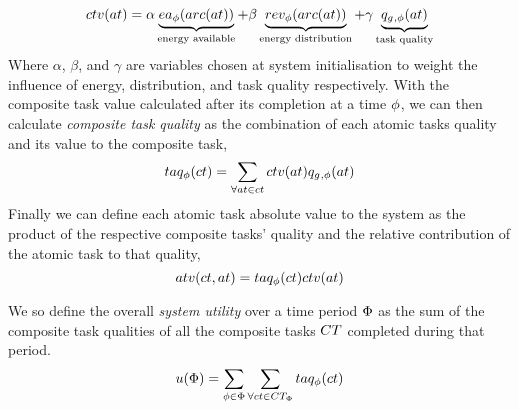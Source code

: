 \begin{equation}
	\label{eq:ctv}
	\functionCompositeTaskValue{}{} = 
	\alpha\underbrace{\functionEnergyAvailable{\functionTaskArc{}{}}{}}_{\text{energy available}}
	+ \beta\underbrace{\functionEnergyVariability{\functionTaskArc{}{}}{}}_{\text{energy distribution}}
	+ 
	\gamma\underbrace{\functionAtomicTaskQualitySignature{}{}}_{\text{task quality}}
\end{equation}
Where $\alpha$, $\beta$, and $\gamma$ are variables chosen at system initialisation to weight the influence of energy, distribution, and task quality respectively. With the composite task value calculated after its completion  at a time $\phi$, we can then calculate \textit{composite task quality} as the combination of each atomic tasks quality and its value to the composite task,
\begin{equation}
\functionCompositeTaskQuality{}{} = \sum\limits_{\forall \varAtomicTask{}{} \in \varCompositeTask{}{}}
\functionCompositeTaskValue{}{}\functionAtomicTaskQualitySignature{}{}	
\end{equation}
Finally we can define each atomic task absolute value to the system as the product of the respective composite tasks' quality and the relative contribution of the atomic task to that quality,
\begin{equation}
	\functionTaskAbsoluteValue{}{} = 
	\functionCompositeTaskQuality{}{}\functionCompositeTaskValue{}{}
\end{equation}

We so define the overall \textit{system utility} over a time period $\Phi$ as the sum of the composite task qualities of all the composite tasks $\setCompositeTask{}{}$ completed during that period.
	\begin{equation}
		\label{eq:system_utility}
		\functionSystemUtility{}{} = \sum\limits_{\varTime{}{} \in \setTime{}{}}
		\sum\limits_{\forall \varCompositeTask{}{} \in \setCompositeTask{\setTime{}{}}{}}
		\functionCompositeTaskQuality{}{}
	\end{equation}